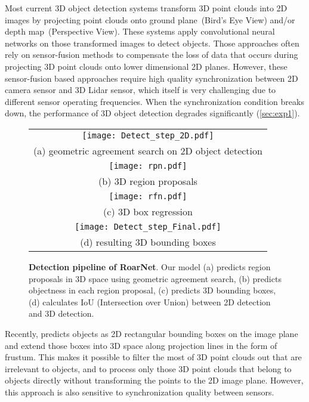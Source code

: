 \documentclass[letterpaper, 10 pt, conference]{ieeeconf}
\begin{document}
Most current 3D object detection systems transform 3D point clouds into 2D images by projecting point clouds onto ground plane~(Bird's Eye View) and/or depth map~(Perspective View). These systems apply convolutional neural networks on those transformed images to detect objects. Those approaches often rely on sensor-fusion methods to compensate the loss of data that occurs during projecting 3D point clouds onto lower dimensional 2D planes. However, these sensor-fusion based approaches require high quality synchronization between 2D camera sensor and 3D Lidar sensor, which itself is very challenging due to different sensor operating frequencies. When the synchronization condition breaks down, the performance of 3D object detection degrades significantly (\cref{sec:exp1}).
\begin{figure}
    \centering
    \begin{tabular}{c}
   \texttt{[image: Detect\_step\_2D.pdf]}\\
   (a) geometric agreement search on 2D object detection\\
   \texttt{[image: rpn.pdf]}\\
   (b) 3D region proposals\\
   \texttt{[image: rfn.pdf]}\\
   (c) 3D box regression\\
\texttt{[image: Detect\_step\_Final.pdf]}\\
   (d) resulting 3D bounding boxes
    \end{tabular}
    \caption{\textbf{Detection pipeline of RoarNet}. Our model (a) predicts region proposals in 3D space using geometric agreement search, (b) predicts objectness in each region proposal, (c) predicts 3D bounding boxes, (d) calculates IoU (Intersection over Union) between 2D detection and 3D detection.}
    \label{fig:3D_Detection_Step}
\end{figure}

Recently, \cite{qi_frustum_2018} predicts objects as 2D rectangular bounding boxes on the image plane and extend those boxes into 3D space along projection lines in the form of frustum. This makes it possible to filter the most of 3D point clouds out that are irrelevant to objects, and to process only those 3D point clouds that belong to objects directly without transforming the points to the 2D image plane. However, this approach is also sensitive to synchronization quality between sensors.
\end{document}
